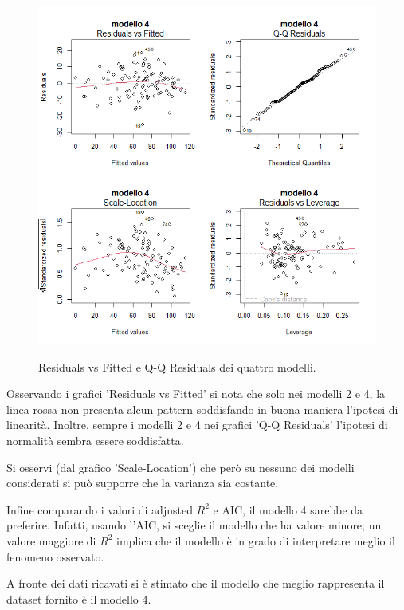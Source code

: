 \begin{figure}[H]
	\centering
	\includegraphics[width=0.75\linewidth]{../graphs/diagnostica/diagnostica_stepwise_iterations}
	\label{fig:diagnosticaridotto}
	\caption{Residuals vs Fitted e Q-Q Residuals dei quattro modelli.}
\end{figure}
Osservando i grafici 'Residuals vs Fitted' si nota che solo nei modelli 2 e 4, la linea rossa non presenta alcun pattern soddisfando in buona maniera l'ipotesi di linearità. Inoltre, sempre i modelli 2 e 4 nei grafici 'Q-Q Residuals' l'ipotesi di normalità sembra essere soddisfatta. 

Si osservi (dal grafico 'Scale-Location') che però su nessuno dei modelli considerati si può supporre che la varianza sia costante.

Infine comparando i valori di adjusted $R^2$ e AIC, il modello 4 sarebbe da preferire. Infatti, usando l'AIC, si sceglie il modello che ha valore minore; un valore maggiore di $R^2$ implica che il modello è in grado di interpretare meglio il fenomeno osservato.

A fronte dei dati ricavati si è stimato che il modello che meglio rappresenta il dataset fornito è il modello 4.


